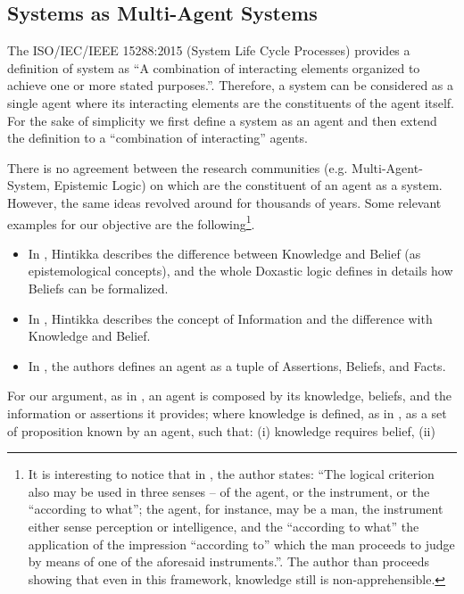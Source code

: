 \documentclass[conference]{IEEEtran}
\begin{document}
\subsection{Systems as Multi-Agent Systems}\label{sec:system}
The ISO/IEC/IEEE 15288:2015 (System Life Cycle Processes) provides a definition
of system as ``A combination of interacting elements organized to achieve one
or more stated purposes.''\autocite{ISO201515288}.  Therefore, a system can be
considered as a single agent where its interacting elements are the
constituents of the agent itself. For the sake of simplicity we first define a
system as an agent and then extend the definition to a ``combination of
interacting'' agents.  

There is no agreement between the research communities (e.g.
Multi-Agent-System, Epistemic Logic) on which are the constituent of an agent
as a system. However, the same ideas revolved around for thousands of years.
Some relevant examples for our objective are the following\footnote{
It is interesting to notice that 
in \autocite{Empiricus1990Pyrrhonism}, the author states: ``The
 logical criterion also may be used in three senses -- of the
 agent, or the instrument, or the ``according to what''; the
 agent, for instance, may be a man, the instrument either sense
 perception or intelligence, and the ``according to what'' the
 application of the impression ``according to'' which the man
 proceeds to judge by means of one of the aforesaid
 instruments.''. The author than proceeds showing that
 even in this framework, knowledge still is non-apprehensible.
}.
\begin{itemize}
	\item In \autocite{Hintikka1962knowledge}, Hintikka describes the
		difference between Knowledge and Belief (as epistemological
		concepts), and the whole Doxastic logic defines in details how
		Beliefs can be formalized.
	\item In \autocite{Hintikka1993Information}, Hintikka describes the concept
		of Information and the difference with Knowledge and Belief.
	\item In \autocite{Santaca2016abf}, the authors defines an agent as a
		tuple of Assertions, Beliefs, and Facts.
\end{itemize}
For our argument, as in \autocite{Santaca2016abf}, an agent is composed by its
knowledge, beliefs, and the information or assertions it provides; where
knowledge is defined, as in \autocite{Steup2020epistemology}, as a set of
proposition known by an agent, such that: (i) knowledge requires belief, (ii)
\end{document}
